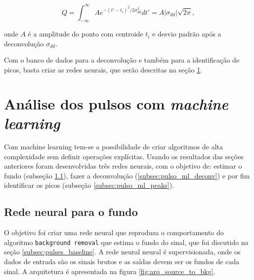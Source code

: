 \documentclass[a4paper,12pt,oneside]{book}
\begin{document}
\begin{equation}\label{eq:gauss_area}
    Q = \int^\infty _{-\infty} Ae^{-(t' - t_i)^2 / 2\sigma_{dd}^2} dt' = A\left |\sigma_{dd} \right|\sqrt{2\pi},
\end{equation}

\par onde $A$ é a amplitude do ponto com centroide $t_i$ e desvio padrão após a deconvolução $\sigma_{dd}$.

\par Com o banco de dados para a deconvolução e também para a identificação de picos, basta criar as redes neurais, que serão descritas na seção \ref{sec:pulsos_ml}.

\section{Análise dos pulsos com \textit{machine learning}}\label{sec:pulsos_ml}


\par Com machine learning tem-se a possibilidade de criar algoritmos de alta complexidade sem definir operações explícitas. Usando os resultados das seções anteriores foram desenvolvidas três redes neurais, com o objetivo de: estimar o fundo (subseção \ref{subsec:pulso_ml_fundo}), fazer a deconvolução (\ref{subsec:pulso_ml_deconv}) e por fim identificar os picos (subseção \ref{subsec:pulso_ml_peaks}). 


\subsection{Rede neural para o fundo}\label{subsec:pulso_ml_fundo}

\par O objetivo foi criar uma rede neural que reproduza o comportamento do algoritmo \texttt{background removal} que estima o fundo do sinal, que foi discutido na seção \ref{subsec:pulses_baseline}. A rede neural neural é supervisionada, onde os dados de entrada são os sinais brutos e as saídas devem ser os fundos de cada sinal. A arquitetura é apresentada na figura \ref{fig:arq_source_to_bkg}.

\end{document}
